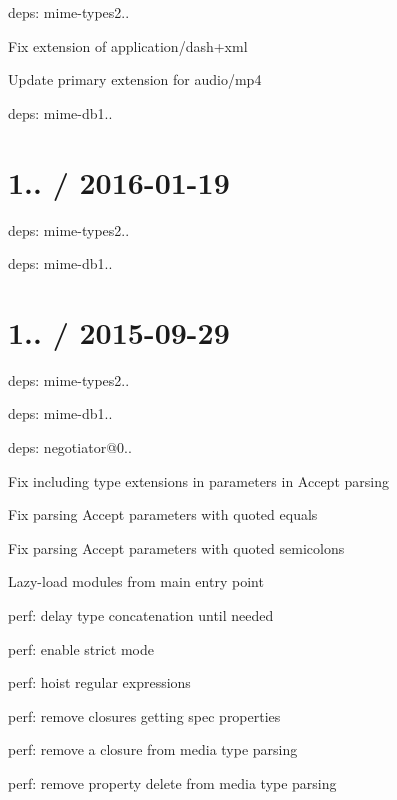 \begin{DoxyItemize}
\item deps\+: mime-\/types2..
\begin{DoxyItemize}
\item Fix extension of {\ttfamily application/dash+xml}
\item Update primary extension for {\ttfamily audio/mp4}
\item deps\+: mime-\/db1..
\end{DoxyItemize}
\end{DoxyItemize}

\section*{1.. / 2016-\/01-\/19 }


\begin{DoxyItemize}
\item deps\+: mime-\/types2..
\begin{DoxyItemize}
\item deps\+: mime-\/db1..
\end{DoxyItemize}
\end{DoxyItemize}

\section*{1.. / 2015-\/09-\/29 }


\begin{DoxyItemize}
\item deps\+: mime-\/types2..
\begin{DoxyItemize}
\item deps\+: mime-\/db1..
\end{DoxyItemize}
\item deps\+: negotiator@0..
\begin{DoxyItemize}
\item Fix including type extensions in parameters in {\ttfamily Accept} parsing
\item Fix parsing {\ttfamily Accept} parameters with quoted equals
\item Fix parsing {\ttfamily Accept} parameters with quoted semicolons
\item Lazy-\/load modules from main entry point
\item perf\+: delay type concatenation until needed
\item perf\+: enable strict mode
\item perf\+: hoist regular expressions
\item perf\+: remove closures getting spec properties
\item perf\+: remove a closure from media type parsing
\item perf\+: remove property delete from media type parsing
\end{DoxyItemize}
\end{DoxyItemize}

